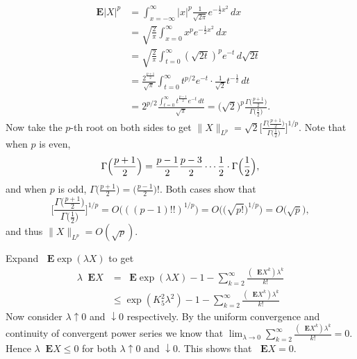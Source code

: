 \documentclass[11pt]{article}
\newcommand{\nm}[1]{\lVert #1 \rVert}
\newcommand{\abs}[1]{\lvert #1 \rvert}
\newcommand{\E}{\mathop{}\!\mathbf{E}}
\theoremstyle{plain}
\theoremstyle{definition}
\theoremstyle{remark}
\theoremstyle{definition}
\newenvironment{mansol}[1]{%
  \renewcommand\themansolinner{#1}%
  \mansolinner
}{\endmansolinner}
\begin{document}
\begin{mansol}{2.5.1}
    \begin{align*}
        \E \abs{X}^p & = \int_{x = -\infty}^{\infty} \abs{x}^p \frac{1}{\sqrt{2 \pi}}e^{-\frac{1}{2}x^2}\,dx \\
        & = \sqrt{\frac{2}{\pi}}\int_{x=0}^\infty x^p e^{-\frac{1}{2}x^2}\,dx \\
        & = \sqrt{\frac{2}{\pi}}\int_{t=0}^\infty (\sqrt{2t})^p e^{-t}\,d{\sqrt{2t}} \\
        & = \frac{2^{\frac{p+1}{2}}}{\sqrt{\pi}} \int_{t=0}^\infty t^{p/2} e^{-t} \cdot \frac{1}{\sqrt{2}} t^{-\frac{1}{2}}\,dt \\
        & = 2^{p/2}\frac{\int_{t=0}^\infty t^{\frac{p-1}{2}} e^{-t}\,dt}{\sqrt{\pi}} = \bigl(\sqrt{2}\bigr)^p\frac{\Gamma\bigl(\frac{p+1}{2}\bigr)}{\Gamma\bigl(\frac{1}{2}\bigr)}.
    \end{align*}
    Now take the $p$-th root on both sides to get $\nm{X}_{L^p} = \sqrt{2} \biggl[\frac{\Gamma\bigl(\frac{p+1}{2}\bigr)}{\Gamma\bigl(\frac{1}{2}\bigr)}\biggr]^{1/p}$. Note that when $p$ is even, \[\Gamma\Bigl(\frac{p+1}{2}\Bigr) = \frac{p-1}{2}\frac{p-3}{2}\cdots\frac{1}{2}\cdot\Gamma\Bigl(\frac{1}{2}\Bigr),\] and when $p$ is odd, $\Gamma\bigl(\frac{p+1}{2}\bigr) = \bigl(\frac{p-1}{2}\bigr)!$. Both cases show that \[\biggl[\frac{\Gamma\bigl(\frac{p+1}{2}\bigr)}{\Gamma\bigl(\frac{1}{2}\bigr)}\biggr]^{1/p} = O\bigl(((p-1)!!)^{1/p}\bigr) = 
    O\bigl(\bigl(\sqrt{p!}\bigr)^{1/p}\bigr) = O\bigl(\sqrt{p}\bigr),\] and thus $\nm{X}_{L^p} = O(\sqrt{p})$.
\end{mansol}

\begin{mansol}{2.5.4}
    Expand $\E \exp(\lambda X)$ to get \begin{align*}
        \lambda \E X & = \E \exp(\lambda X) - 1 - \sum_{k=2}^\infty \frac{(\E X^k)\lambda^k}{k!} \\
        & \leq \exp(K_5^2 \lambda^2) - 1 - \sum_{k=2}^\infty \frac{(\E X^k)\lambda^k}{k!}
    \end{align*}
    Now consider $\lambda \uparrow 0$ and $\downarrow 0$ respectively. By the uniform convergence and continuity of convergent power series we know that $\lim_{\lambda \to 0}\sum_{k=2}^\infty \frac{(\E X^k)\lambda^k}{k!} = 0$. Hence $\lambda \E X \leq 0$ for both $\lambda \uparrow 0$ and $\downarrow 0$. This shows that $\E X = 0$.
\end{mansol}
\end{document}
